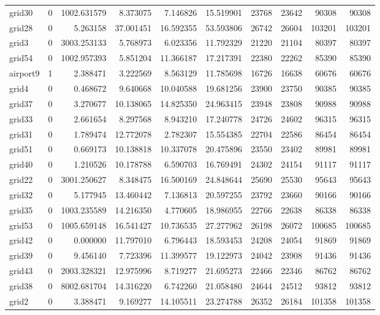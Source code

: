 \begin{longtable}{|l|r|r|r|r|r|r|r|r|r|}
grid30 & 0 & 1002.631579 & 8.373075 & 7.146826 & 15.519901 & 23768 & 23642 & 90308 & 90308 \\
grid28 & 0 & 5.263158 & 37.001451 & 16.592355 & 53.593806 & 26742 & 26604 & 103201 & 103201 \\
grid3 & 0 & 3003.253133 & 5.768973 & 6.023356 & 11.792329 & 21220 & 21104 & 80397 & 80397 \\
grid54 & 0 & 1002.957393 & 5.851204 & 11.366187 & 17.217391 & 22380 & 22262 & 85390 & 85390 \\
airport9 & 1 & 2.388471 & 3.222569 & 8.563129 & 11.785698 & 16726 & 16638 & 60676 & 60676 \\
grid4 & 0 & 0.468672 & 9.640668 & 10.040588 & 19.681256 & 23900 & 23750 & 90385 & 90385 \\
grid37 & 0 & 3.270677 & 10.138065 & 14.825350 & 24.963415 & 23948 & 23808 & 90988 & 90988 \\
grid33 & 0 & 2.661654 & 8.297568 & 8.943210 & 17.240778 & 24726 & 24602 & 96315 & 96315 \\
grid31 & 0 & 1.789474 & 12.772078 & 2.782307 & 15.554385 & 22704 & 22586 & 86454 & 86454 \\
grid51 & 0 & 0.669173 & 10.138818 & 10.337078 & 20.475896 & 23550 & 23402 & 89981 & 89981 \\
grid40 & 0 & 1.210526 & 10.178788 & 6.590703 & 16.769491 & 24302 & 24154 & 91117 & 91117 \\
grid22 & 0 & 3001.250627 & 8.348475 & 16.500169 & 24.848644 & 25690 & 25530 & 95643 & 95643 \\
grid32 & 0 & 5.177945 & 13.460442 & 7.136813 & 20.597255 & 23792 & 23660 & 90166 & 90166 \\
grid35 & 0 & 1003.235589 & 14.216350 & 4.770605 & 18.986955 & 22766 & 22638 & 86338 & 86338 \\
grid53 & 0 & 1005.659148 & 16.541427 & 10.736535 & 27.277962 & 26198 & 26072 & 100685 & 100685 \\
grid42 & 0 & 0.000000 & 11.797010 & 6.796443 & 18.593453 & 24208 & 24054 & 91869 & 91869 \\
grid39 & 0 & 9.456140 & 7.723396 & 11.399577 & 19.122973 & 24042 & 23908 & 91436 & 91436 \\
grid43 & 0 & 2003.328321 & 12.975996 & 8.719277 & 21.695273 & 22466 & 22346 & 86762 & 86762 \\
grid38 & 0 & 8002.681704 & 14.316220 & 6.742260 & 21.058480 & 24644 & 24512 & 93812 & 93812 \\
grid2 & 0 & 3.388471 & 9.169277 & 14.105511 & 23.274788 & 26352 & 26184 & 101358 & 101358 \\

\end{longtable}
